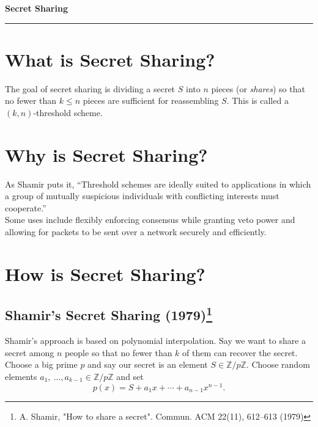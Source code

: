 \documentclass[12pt]{article}
\newcommand{\integers}{\mathbb{Z}}
\begin{document}
\begin{center}
{\bf \Large Secret Sharing}
\vspace{0.2cm}
\hrule
\end{center}

\section*{What is Secret Sharing?}
The goal of secret sharing is dividing a secret $S$ into $n$ pieces (or \textit{shares}) so that no fewer than $k\leq n$ pieces are sufficient for reassembling $S$. This is called a $(k,n)$-threshold scheme.

\section*{Why is Secret Sharing?}
As Shamir puts it, ``Threshold schemes are ideally suited to applications in which a group of mutually suspicious individuals with conflicting interests must cooperate.''\\

Some uses include flexibly enforcing consensus while granting veto power and allowing for packets to be sent over a network securely and efficiently.


\section*{How is Secret Sharing?}
\subsection*{Shamir's Secret Sharing (1979)\footnote{A. Shamir, "How to share a secret". Commun. ACM 22(11), 612–613 (1979)}}
Shamir's approach is based on polynomial interpolation. Say we want to share a secret among $n$ people so that no fewer than $k$ of them can recover the secret. Choose a big prime $p$ and say our secret is an element $S\in \integers/p\integers$. Choose random elements $a_1,\ \ldots, a_{k-1}\in \integers/p\integers$ and set
\[
p(x) = S + a_1x + \cdots + a_{n-1}x^{n-1}.
\]
\end{document}
